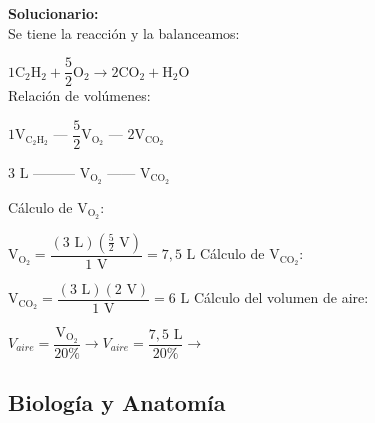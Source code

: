 \begin{enumerate}
	\vspace{2mm}
	\textbf{Solucionario:}\\
	Se tiene la reacción y la balanceamos:
	
	$ 1\text{C}_2\text{H}_2 + \dfrac{5}{2}\text{O}_2 \rightarrow 2\text{CO}_2 + \text{H}_2\text{O} $\\
	
	Relación de volúmenes:
	
	$ 1\text{V}_{\text{C}_2\text{H}_2} \text{ --- } \dfrac{5}{2}\text{V}_{\text{O}_2} \text{ --- } 2\text{V}_{\text{CO}_2} $
	
	$ 3\text{ L} \text{ --------- } \text{V}_{\text{O}_2} \text{ ------ } \text{V}_{\text{CO}_2} $
	
	Cálculo de $\text{V}_{\text{O}_2}$:
	
	$ \text{V}_{\text{O}_2} = \dfrac{(3\text{ L})(\frac{5}{2}\text{ V})}{1\text{ V}} = 7,5\text{ L} $
	Cálculo de $\text{V}_{\text{CO}_2}$:
	
	$ \text{V}_{\text{CO}_2} = \dfrac{(3\text{ L})(2\text{ V})}{1\text{ V}} = 6\text{ L} $
	Cálculo del volumen de aire:
	
	$ V_{aire} = \dfrac{\text{V}_{\text{O}_2}}{20\%} \rightarrow V_{aire} = \dfrac{7,5\text{ L}}{20\%} \rightarrow$  
	
	\vspace{6mm}
	
\end{enumerate}






\subsection*{Biología y Anatomía}

